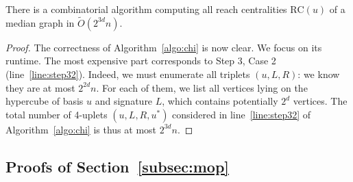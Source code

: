 \documentclass[a4paper,UKenglish,numberwithinsect,cleveref, autoref,anonymous]{lipics-v2021}
\newcommand{\rc}{\mbox{RC}}
\begin{document}
\begin{theorem}
There is a combinatorial algorithm computing all  reach centralities $\rc(u)$ of a median graph in $\tilde{O}(2^{3d}n)$.
\label{th:simple_rc}
\end{theorem}
\begin{proof}
The correctness of Algorithm~\ref{algo:chi} is now clear. We focus on its runtime. The most expensive part corresponds to Step 3, Case 2 (line~\ref{line:step32}). Indeed, we must enumerate all triplets $(u,L,R)$: we know they are at most $2^{2d}n$. For each of them, we list all vertices lying on the hypercube of basis $u$ and signature $L$, which contains potentially $2^d$ vertices. The total number of 4-uplets $(u,L,R,u^*)$ considered in line~\ref{line:step32} of Algorithm~\ref{algo:chi} is thus at most $2^{3d}n$.
\end{proof}

\subsection{Proofs of Section~\ref{subsec:mop}} \label{asubsec:mop}
\end{document}
